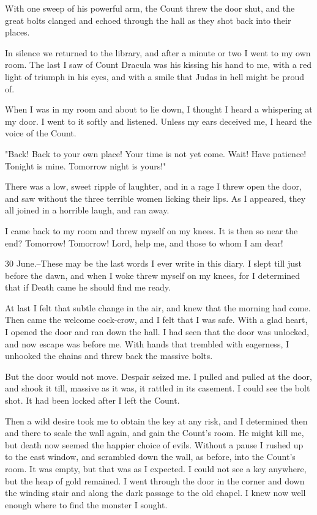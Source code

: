 With one sweep of his powerful arm, the Count threw the door shut, and the great bolts clanged and echoed through the hall as they shot back into their places. 

In silence we returned to the library, and after a minute or two I went to my own room. The last I saw of Count Dracula was his kissing his hand to me, with a red light of triumph in his eyes, and with a smile that Judas in hell might be proud of. 

When I was in my room and about to lie down, I thought I heard a whispering at my door. I went to it softly and listened. Unless my ears deceived me, I heard the voice of the Count. 

"Back! Back to your own place! Your time is not yet come. Wait! Have patience! Tonight is mine. Tomorrow night is yours!" 

There was a low, sweet ripple of laughter, and in a rage I threw open the door, and saw without the three terrible women licking their lips. As I appeared, they all joined in a horrible laugh, and ran away. 

I came back to my room and threw myself on my knees. It is then so near the end? Tomorrow! Tomorrow! Lord, help me, and those to whom I am dear! 

30 June.--These may be the last words I ever write in this diary. I slept till just before the dawn, and when I woke threw myself on my knees, for I determined that if Death came he should find me ready. 

At last I felt that subtle change in the air, and knew that the morning had come. Then came the welcome cock-crow, and I felt that I was safe. With a glad heart, I opened the door and ran down the hall. I had seen that the door was unlocked, and now escape was before me. With hands that trembled with eagerness, I unhooked the chains and threw back the massive bolts. 

But the door would not move. Despair seized me. I pulled and pulled at the door, and shook it till, massive as it was, it rattled in its casement. I could see the bolt shot. It had been locked after I left the Count. 

Then a wild desire took me to obtain the key at any risk, and I determined then and there to scale the wall again, and gain the Count's room. He might kill me, but death now seemed the happier choice of evils. Without a pause I rushed up to the east window, and scrambled down the wall, as before, into the Count's room. It was empty, but that was as I expected. I could not see a key anywhere, but the heap of gold remained. I went through the door in the corner and down the winding stair and along the dark passage to the old chapel. I knew now well enough where to find the monster I sought. 

